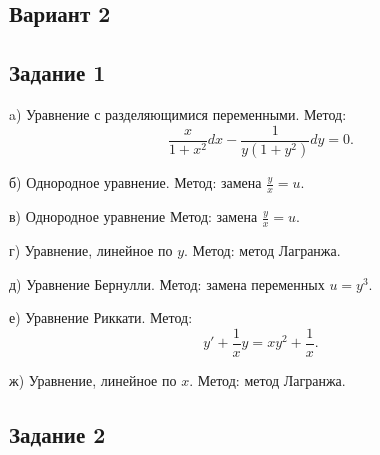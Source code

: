 \documentclass[11pt, a4paper]{article}
\begin{document}
	
	\begin{center}
	\subsection*{Вариант 2}
	\end{center}
	
	\subsection*{Задание 1}
	
	\par
	a) Уравнение с разделяющимися переменными. Метод:
	\begin{equation*}
		\frac{x}{1 + x^2}dx - \frac{1}{y(1+y^2)}dy = 0.
	\end{equation*}
	
	\noindent
	б) Однородное уравнение. Метод: замена $\frac{y}{x}=u$.
	
	\noindent
	в) Однородное уравнение Метод: замена $\frac{y}{x}=u$.
	
	\noindent
	г) Уравнение, линейное по $y$. Метод: метод Лагранжа.
	
	\noindent
	д) Уравнение Бернулли. Метод: замена переменных $u=y^3$.
	
	\noindent
	е) Уравнение Риккати. Метод: 
	\begin{equation*}
		y' + \frac{1}{x}y = xy^2 + \frac{1}{x}.
	\end{equation*}
	
	\noindent
	ж) Уравнение, линейное по $x$. Метод: метод Лагранжа.

	
	\subsection*{Задание 2}
	
\end{document}
